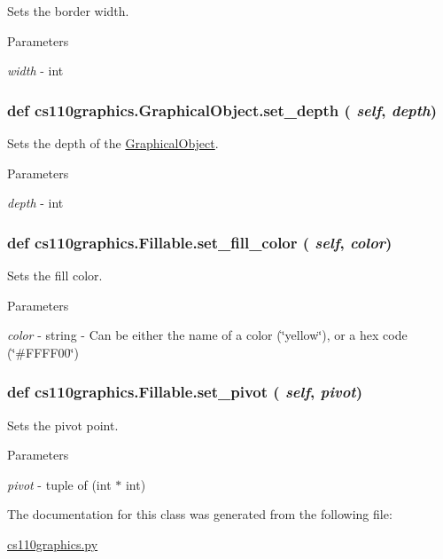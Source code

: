 Sets the border width. 
\begin{DoxyParams}{Parameters}
\item[{\em width}]-\/ int \end{DoxyParams}
\hypertarget{classcs110graphics_1_1GraphicalObject_a20d76d4ee4419c3065d61deb6cbc6700}{
\subsubsection[{set\_\-depth}]{\setlength{\rightskip}{0pt plus 5cm}def cs110graphics.GraphicalObject.set\_\-depth ( {\em self}, \/   {\em depth})}}
\label{classcs110graphics_1_1GraphicalObject_a20d76d4ee4419c3065d61deb6cbc6700}


Sets the depth of the \hyperlink{classcs110graphics_1_1GraphicalObject}{GraphicalObject}. 
\begin{DoxyParams}{Parameters}
\item[{\em depth}]-\/ int \end{DoxyParams}
\hypertarget{classcs110graphics_1_1Fillable_a4f24c7186c8d057e42a0209eb1d56be7}{
\subsubsection[{set\_\-fill\_\-color}]{\setlength{\rightskip}{0pt plus 5cm}def cs110graphics.Fillable.set\_\-fill\_\-color ( {\em self}, \/   {\em color})}}
\label{classcs110graphics_1_1Fillable_a4f24c7186c8d057e42a0209eb1d56be7}


Sets the fill color. 
\begin{DoxyParams}{Parameters}
\item[{\em color}]-\/ string -\/ Can be either the name of a color (\char`\"{}yellow\char`\"{}), or a hex code (\char`\"{}\#FFFF00\char`\"{}) \end{DoxyParams}
\hypertarget{classcs110graphics_1_1Fillable_a2a6066d1a11c0854ff5ee85e7d9ceb54}{
\subsubsection[{set\_\-pivot}]{\setlength{\rightskip}{0pt plus 5cm}def cs110graphics.Fillable.set\_\-pivot ( {\em self}, \/   {\em pivot})}}
\label{classcs110graphics_1_1Fillable_a2a6066d1a11c0854ff5ee85e7d9ceb54}


Sets the pivot point. 
\begin{DoxyParams}{Parameters}
\item[{\em pivot}]-\/ tuple of (int $\ast$ int) \end{DoxyParams}


The documentation for this class was generated from the following file:\begin{DoxyCompactItemize}
\item 
\hyperlink{cs110graphics_8py}{cs110graphics.py}\end{DoxyCompactItemize}
